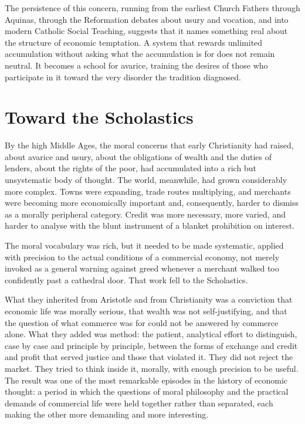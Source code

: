 \documentclass[11pt,a4paper,oneside]{book}
\begin{document}
The persistence of this concern, running from the earliest Church Fathers through Aquinas, through the Reformation debates about usury and vocation, and into modern Catholic Social Teaching, suggests that it names something real about the structure of economic temptation. A system that rewards unlimited accumulation without asking what the accumulation is for does not remain neutral. It becomes a school for avarice, training the desires of those who participate in it toward the very disorder the tradition diagnosed.

\section*{Toward the Scholastics}

By the high Middle Ages, the moral concerns that early Christianity had raised, about avarice and usury, about the obligations of wealth and the duties of lenders, about the rights of the poor, had accumulated into a rich but unsystematic body of thought. The world, meanwhile, had grown considerably more complex. Towns were expanding, trade routes multiplying, and merchants were becoming more economically important and, consequently, harder to dismiss as a morally peripheral category. Credit was more necessary, more varied, and harder to analyse with the blunt instrument of a blanket prohibition on interest.

The moral vocabulary was rich, but it needed to be made systematic, applied with precision to the actual conditions of a commercial economy, not merely invoked as a general warning against greed whenever a merchant walked too confidently past a cathedral door. That work fell to the Scholastics.

What they inherited from Aristotle and from Christianity was a conviction that economic life was morally serious, that wealth was not self-justifying, and that the question of what commerce was for could not be answered by commerce alone. What they added was method: the patient, analytical effort to distinguish, case by case and principle by principle, between the forms of exchange and credit and profit that served justice and those that violated it. They did not reject the market. They tried to think inside it, morally, with enough precision to be useful. The result was one of the most remarkable episodes in the history of economic thought: a period in which the questions of moral philosophy and the practical demands of commercial life were held together rather than separated, each making the other more demanding and more interesting.
\end{document}
